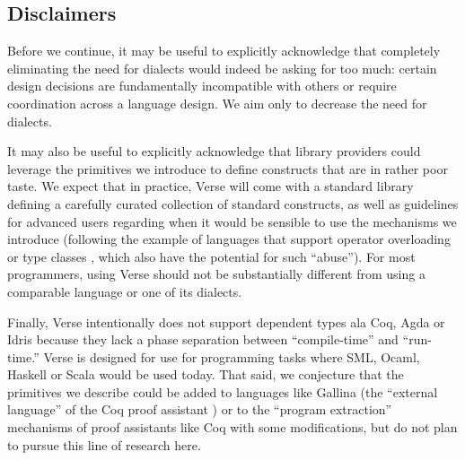 \subsection{Disclaimers}
Before we continue, it may be useful to explicitly acknowledge that completely eliminating the need for dialects would indeed be asking for too much: certain design decisions are fundamentally incompatible with others or require coordination across a language design. We aim only to decrease the need for dialects.%

It may also be useful to explicitly acknowledge that library providers could leverage the primitives we introduce   to define constructs that are in rather poor taste. We  expect that in practice, Verse will come with a standard library defining a carefully curated collection of standard constructs, as well as guidelines for advanced users regarding when it would be sensible to use the mechanisms we introduce (following the example of languages that support operator overloading or type classes \cite{Hall:1996:TCH:227699.227700}, which also have the potential for such ``abuse''). For most programmers, using Verse should not be substantially different from using a comparable language or one of its dialects.%

Finally, Verse intentionally does not support dependent types ala Coq, Agda or Idris because they lack a  phase separation between ``compile-time'' and ``run-time.'' Verse is designed for use for programming tasks where SML, Ocaml, Haskell or Scala would be used today. That said, we conjecture that the primitives we describe could be added to languages like Gallina (the ``external language'' of the Coq proof assistant  \cite{Coq:manual}) or to the ``program extraction'' mechanisms of proof assistants like Coq with some modifications, but do not plan to pursue this line of research here. %

